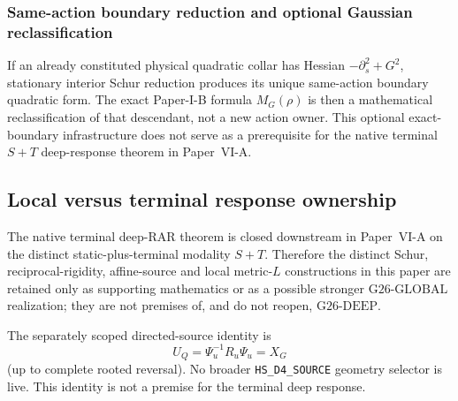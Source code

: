 \documentclass[11pt,a4paper]{article}
\begin{document}
\subsubsection{Same-action boundary reduction and optional Gaussian reclassification}
If an already constituted physical quadratic collar has Hessian
$-\partial_s^2+G^2$, stationary interior Schur reduction produces its unique
same-action boundary quadratic form.  The exact Paper-I-B formula
$M_G(\rho)$ is then a mathematical reclassification of that descendant, not a
new action owner.  This optional exact-boundary infrastructure does not serve
as a prerequisite for the native terminal $S+T$ deep-response theorem in
Paper~VI-A.


\subsection{Local versus terminal response ownership}
\label{p3f:sec:v1114-g26-g15-scope-sync}
The native terminal deep-RAR theorem is closed downstream in Paper~VI-A on
the distinct static-plus-terminal modality \(S+T\).  Therefore the distinct
Schur, reciprocal-rigidity, affine-source and local metric-\(L\) constructions
in this paper are retained only as supporting mathematics or as a possible
stronger \(\mathrm{G26\text{-}GLOBAL}\) realization; they are not premises of,
and do not reopen, \(\mathrm{G26\text{-}DEEP}\).

The separately scoped directed-source identity is
\[
 \boxed{U_Q=\Psi_u^{-1}R_u\Psi_u=X_G}
\]
(up to complete rooted reversal).  No broader \texttt{HS\_D4\_SOURCE} geometry selector is live.  This identity is
not a premise for the terminal deep response.
\end{document}
